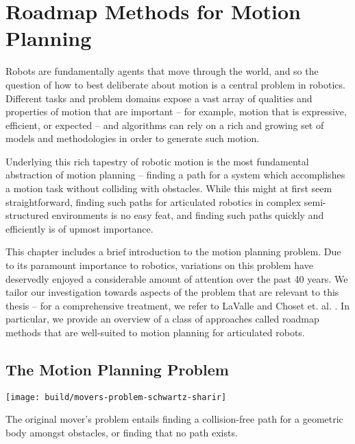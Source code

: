 \chapter{Roadmap Methods for Motion Planning}
\label{chap:roadmaps}

Robots are fundamentally agents that move through the world,
and so the question of how to best deliberate about motion
is a central problem in robotics.
Different tasks and problem domains expose a vast array of
qualities and properties of motion that are important
-- for example, motion that is expressive, efficient, or expected
-- and algorithms can rely on a rich and growing set
of models and methodologies in order to generate such motion.

Underlying this rich tapestry of robotic motion
is the most fundamental abstraction of motion planning --
finding a path for a system which accomplishes a motion task
without colliding with obstacles.
While this might at first seem straightforward,
finding such paths for articulated robotics in
complex semi-structured environments
is no easy feat,
and finding such paths quickly and efficiently
is of upmost importance.

This chapter includes a brief introduction to
the motion planning problem.
Due to its paramount importance to robotics,
variations on this problem have deservedly
enjoyed a considerable amount of attention over the past 40 years.
We tailor our investigation towards aspects of the problem
that are relevant to this thesis
-- for a comprehensive treatment,
we refer to LaValle \citep{lavalle2006planningbook}
and Choset et. al. \citep{choset2005robotmotion}.
In particular,
we provide an overview of a class of approaches called roadmap methods
that are well-suited to motion planning for articulated robots.

\section{The Motion Planning Problem}

\begin{marginfigure}
   \centering
   \texttt{[image: build/movers-problem-schwartz-sharir]} %
   \caption[The original mover's problem
      entails finding a collision-free path for a geometric body
      amongst obstacles,
      or finding that no path exists.
   ]{The original mover's problem
      \citep{schwartzsharir1983pianomovers1}
      entails finding a collision-free path for a geometric body
      amongst obstacles,
      or finding that no path exists.}
   \label{fig:roadmaps:movers}
\end{marginfigure}


